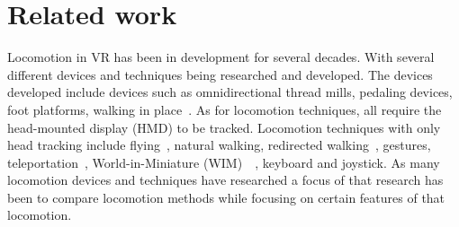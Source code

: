 \chapter{Related work}
\label{chap:related_work}




Locomotion in VR has been in development for several decades. With several different devices and techniques being researched and developed. The devices developed include devices such as omnidirectional thread mills, pedaling devices, foot platforms, walking in place~\cite{hollerbach2002locomotion}. As for locomotion techniques, all require the head-mounted display (HMD) to be tracked. Locomotion techniques with only head tracking include flying~\cite{usoh1999walking}, natural walking, redirected walking~\cite{razzaque2005redirected}, gestures, teleportation~\cite{frommel2017effects}, World-in-Miniature (WIM)~\cite{pausch1995navigation}~\cite{stoakley1995virtual}, keyboard and joystick. As many locomotion devices and techniques have researched a focus of that research has been to compare locomotion methods while focusing on certain features of that locomotion.
\bigskip


